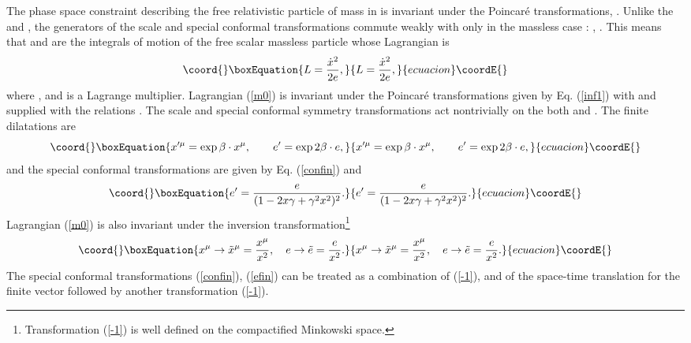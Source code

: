 \documentclass[a4paper,12pt]{article}
\def\R{\mathbb R}
\begin{document}
The phase space constraint
\coordHE{}
describing the
free relativistic particle of mass \coordHE{}
in \myHighlight{$\R^{1,d-1}$}\coordHE{} is invariant under the Poincar\'e
transformations, \coordHE{}.
Unlike the \coordHE{} and \coordHE{},
the generators
of the scale and special conformal transformations
commute weakly with \coordHE{} only in the
massless case \coordHE{}:
\coordHE{},
\coordHE{}.
This means that \coordHE{} and \coordHE{} are the integrals of
motion of the free scalar massless particle
whose Lagrangian is
\begin{equation}\coord{}\boxEquation{
L=\frac{\dot{x}^2}{2e},
\label{m0}
}{
L=\frac{\dot{x}^2}{2e},
}{ecuacion}\coordE{}\end{equation}
where \coordHE{},
and \coordHE{} is a Lagrange multiplier.
Lagrangian (\ref{m0}) is
invariant under the Poincar\'e transformations
given by Eq. (\ref{inf1}) with
\coordHE{} and supplied with the
relations \coordHE{}.
The scale and special conformal symmetry
transformations act nontrivially
on the both \coordHE{} and \coordHE{}.
The finite dilatations are
\begin{equation}\coord{}\boxEquation{
x'^\mu=\exp\beta \cdot x^\mu,
\qquad
e'=\exp 2\beta \cdot e,
\label{findil}
}{
x'^\mu=\exp\beta \cdot x^\mu,
\qquad
e'=\exp 2\beta \cdot e,
}{ecuacion}\coordE{}\end{equation}
and the
special conformal
transformations are given by
Eq. (\ref{confin})
and
\begin{equation}\coord{}\boxEquation{
e'=\frac{e}{(1-2x\gamma+\gamma^2 x^2)^2}.
\label{efin}
}{
e'=\frac{e}{(1-2x\gamma+\gamma^2 x^2)^2}.
}{ecuacion}\coordE{}\end{equation}
Lagrangian (\ref{m0})
is also invariant under the inversion
transformation\footnote{Transformation (\ref{-1})
is well defined on the compactified
Minkowski space.}
\begin{equation}\coord{}\boxEquation{
x^\mu \rightarrow \tilde{x}{}^\mu=\frac{x^\mu}{x^2},\quad
e\rightarrow \tilde e=\frac{e}{x^2}.
\label{-1}
}{
x^\mu \rightarrow \tilde{x}{}^\mu=\frac{x^\mu}{x^2},\quad
e\rightarrow \tilde e=\frac{e}{x^2}.
}{ecuacion}\coordE{}\end{equation}
The special conformal
transformations (\ref{confin}),
(\ref{efin})
can be treated as
a combination of
(\ref{-1}),
and of the space-time translation for the finite vector
\myHighlight{$-\gamma^\mu$}\coordHE{}
followed by another transformation (\ref{-1}).
\end{document}
